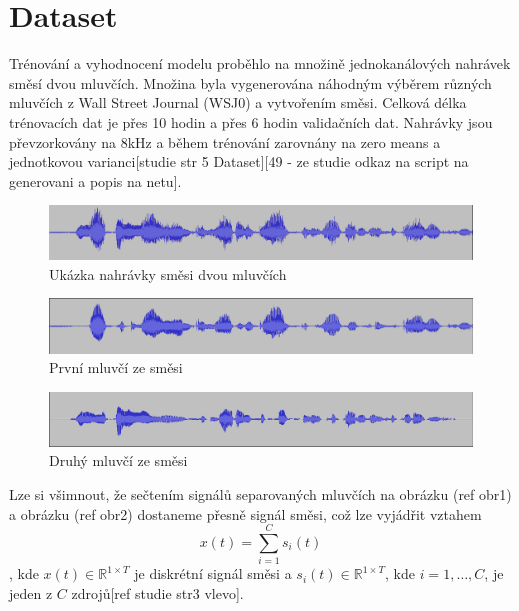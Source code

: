\section{Dataset}
Trénování a vyhodnocení modelu proběhlo na množině jednokanálových nahrávek směsí dvou mluvčích. Množina byla vygenerována náhodným výběrem různých mluvčích z Wall Street Journal (WSJ0) a vytvořením směsi. Celková délka trénovacích dat je přes 10 hodin a přes 6 hodin validačních dat. Nahrávky jsou převzorkovány na 8kHz a během trénování zarovnány na zero means a jednotkovou varianci[studie str 5 Dataset][49 - ze studie odkaz na script na generovani a popis na netu].
\begin{figure}[H]
    \centering
    \includegraphics[scale=0.35]{obrazky-figures/dataset-mix.png}
    \caption{\label{fig:ref-mixture}Ukázka nahrávky směsi dvou mluvčích}
\end{figure}
\begin{figure}[H]
    \centering
    \includegraphics[scale=0.35]{obrazky-figures/dataset-s1.png}
    \caption{\label{fig:ref-s1}První mluvčí ze směsi}
\end{figure}
\begin{figure}[H]
    \centering
    \includegraphics[scale=0.35]{obrazky-figures/dataset-s2.png}
    \caption{\label{fig:ref-s2}Druhý mluvčí ze směsi}
\end{figure}
Lze si všimnout, že sečtením signálů separovaných mluvčích na obrázku (ref obr1) a obrázku (ref obr2) dostaneme přesně signál směsi, což lze vyjádřit vztahem
\begin{equation}
  x(t) = \sum_{i=1}^C s_i(t)
\end{equation}
, kde $x(t) \in \mathbb{R}^{1 \times T}$ je diskrétní signál směsi a $s_i(t) \in \mathbb{R}^{1 \times T}$, kde $i = 1,\ldots,C$, je jeden z $C$ zdrojů[ref studie str3 vlevo]. 

